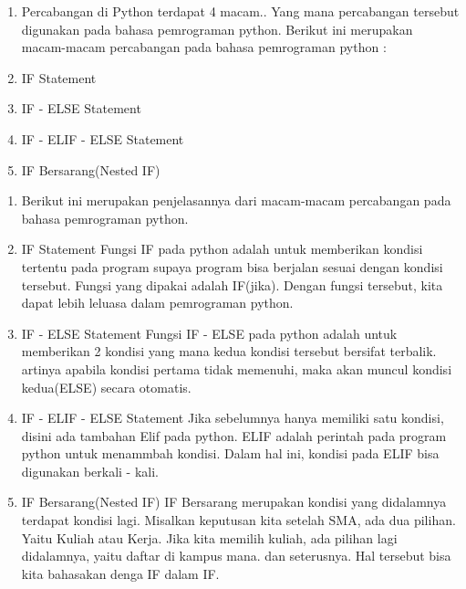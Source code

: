 		 \begin{enumerate}
			\item Percabangan di Python terdapat 4 macam.. Yang mana percabangan tersebut digunakan pada bahasa pemrograman python. Berikut ini merupakan macam-macam percabangan pada bahasa pemrograman python :
			\item IF Statement
			\item IF - ELSE Statement
			\item IF - ELIF - ELSE Statement
			\item IF Bersarang(Nested IF)
		\end{enumerate}
			
		\begin{enumerate}
			\item Berikut ini merupakan penjelasannya dari macam-macam percabangan pada bahasa pemrograman python.
			\item IF Statement Fungsi IF pada python adalah untuk memberikan kondisi tertentu pada program supaya program bisa berjalan sesuai dengan kondisi tersebut. Fungsi yang dipakai adalah IF(jika). Dengan fungsi tersebut, kita dapat lebih leluasa dalam pemrograman python.
			\item IF - ELSE Statement Fungsi IF - ELSE pada python adalah untuk memberikan 2 kondisi yang mana kedua kondisi tersebut bersifat terbalik. artinya apabila kondisi pertama tidak memenuhi, maka akan muncul kondisi kedua(ELSE) secara otomatis.
			\item IF - ELIF - ELSE Statement Jika sebelumnya hanya memiliki satu kondisi, disini ada tambahan Elif pada python. ELIF adalah perintah pada program python untuk menammbah kondisi. Dalam hal ini, kondisi pada ELIF bisa digunakan berkali - kali.
			\item IF Bersarang(Nested IF) IF Bersarang merupakan kondisi yang didalamnya terdapat kondisi lagi. Misalkan keputusan kita setelah SMA, ada dua pilihan. Yaitu Kuliah atau Kerja. Jika kita memilih kuliah, ada pilihan lagi didalamnya, yaitu daftar di kampus mana. dan seterusnya. Hal tersebut bisa kita bahasakan denga IF dalam IF.
		\end{enumerate}
		
\cite{scherer2000vpython}
\cite{sherwood2011vpython}
\cite{roberts2004teaching}
\cite{marciuc2016using}


